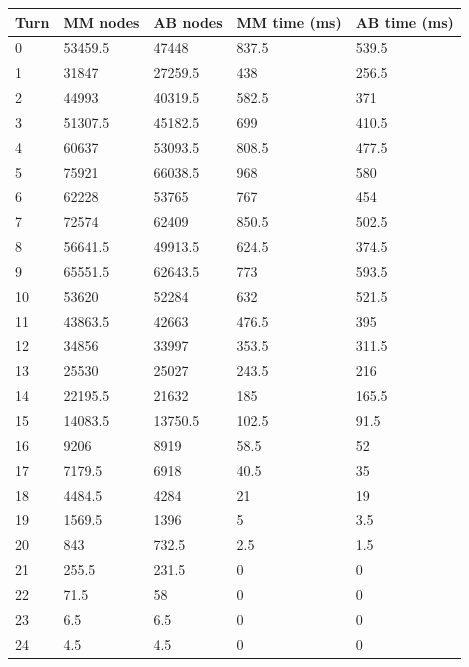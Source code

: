 \documentclass[12pt]{article}
\begin{document}
\begin{table}[h]
\begin{tabular}{|l|l|l|l|l|}
\hline
Turn & MM nodes & AB nodes & MM time (ms) & AB time (ms) \\ \hline
0    & 53459.5  & 47448    & 837.5        & 539.5        \\ \hline
1    & 31847    & 27259.5  & 438          & 256.5        \\ \hline
2    & 44993    & 40319.5  & 582.5        & 371          \\ \hline
3    & 51307.5  & 45182.5  & 699          & 410.5        \\ \hline
4    & 60637    & 53093.5  & 808.5        & 477.5        \\ \hline
5    & 75921    & 66038.5  & 968          & 580          \\ \hline
6    & 62228    & 53765    & 767          & 454          \\ \hline
7    & 72574    & 62409    & 850.5        & 502.5        \\ \hline
8    & 56641.5  & 49913.5  & 624.5        & 374.5        \\ \hline
9    & 65551.5  & 62643.5  & 773          & 593.5        \\ \hline
10   & 53620    & 52284    & 632          & 521.5        \\ \hline
11   & 43863.5  & 42663    & 476.5        & 395          \\ \hline
12   & 34856    & 33997    & 353.5        & 311.5        \\ \hline
13   & 25530    & 25027    & 243.5        & 216          \\ \hline
14   & 22195.5  & 21632    & 185          & 165.5        \\ \hline
15   & 14083.5  & 13750.5  & 102.5        & 91.5         \\ \hline
16   & 9206     & 8919     & 58.5         & 52           \\ \hline
17   & 7179.5   & 6918     & 40.5         & 35           \\ \hline
18   & 4484.5   & 4284     & 21           & 19           \\ \hline
19   & 1569.5   & 1396     & 5            & 3.5          \\ \hline
20   & 843      & 732.5    & 2.5          & 1.5          \\ \hline
21   & 255.5    & 231.5    & 0            & 0            \\ \hline
22   & 71.5     & 58       & 0            & 0            \\ \hline
23   & 6.5      & 6.5      & 0            & 0            \\ \hline
24   & 4.5      & 4.5      & 0            & 0            \\ \hline
\end{tabular}
\end{table}
\end{document}
